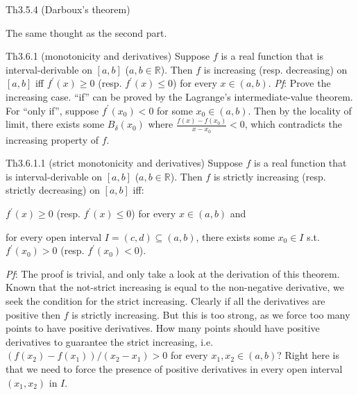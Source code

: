\documentclass{article}
\begin{document}
\begin{Th}{Th3.5.4 (Darboux's theorem)}
\begin{compactenum}
        \item The same thought as the second part.  
    \end{compactenum}
\end{Th}

\begin{Th}{Th3.6.1 (monotonicity and derivatives)}
    Suppose $f$ is a real function that is interval-derivable on $[a,b]$ ($a,b\in\mathbb{R}$). Then $f$ is increasing (resp. decreasing) on $[a,b]$ iff $f^\prime(x)\geq 0$ (resp. $f^\prime(x)\leq 0$) for every $x\in (a,b)$.
    \tcblower
    \textit{Pf}: Prove the increasing case. ``if'' can be proved by the Lagrange's intermediate-value theorem. For ``only if'', suppose $f^\prime(x_0) < 0$ for some $x_0\in (a,b)$. Then by the locality of limit, there exists some $B_\delta(x_0)$ where $\frac{f(x)-f(x_0)}{x-x_0} < 0$, which contradicts the increasing property of $f$.
\end{Th}

\begin{Th}{Th3.6.1.1 (strict monotonicity and derivatives)}
    Suppose $f$ is a real function that is interval-derivable on $[a,b]$ ($a,b\in\mathbb{R}$). Then $f$ is strictly increasing (resp. strictly decreasing) on $[a,b]$ iff:
    \begin{compactenum}
        \item $f^\prime(x)\geq 0$ (resp. $f^\prime(x)\leq 0$) for every $x\in (a,b)$ and 
        \item for every open interval $I=(c,d)\subseteq (a,b)$, there exists some $x_0\in I$ s.t. $f^\prime(x_0) > 0$ (resp. $f^\prime(x_0) < 0$).
    \end{compactenum}
    \tcblower
    \textit{Pf}: The proof is trivial, and only take a look at the derivation of this theorem. Known that the not-strict increasing is equal to the non-negative derivative, we seek the condition for the strict increasing. Clearly if all the derivatives are positive then $f$ is strictly increasing. But this is too strong, as we force too many points to have positive derivatives. How many points should have positive derivatives to guarantee the strict increasing, i.e. $(f(x_2)-f(x_1)) / (x_2-x_1) > 0$ for every $x_1, x_2\in (a,b)$? Right here is that we need to force the presence of positive derivatives in every open interval $(x_1, x_2)$ in $I$.
\end{Th}
\end{document}
